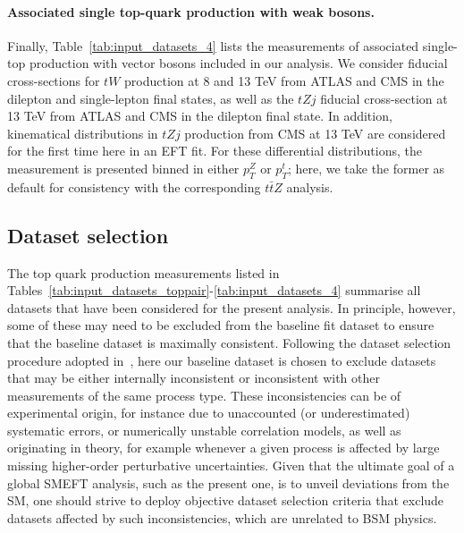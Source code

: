 \documentclass[withindex,glossary]{cam-thesis}
\begin{document}


\paragraph{Associated single top-quark production with weak bosons.}
%
Finally, Table~\ref{tab:input_datasets_4}
lists the measurements of associated single-top production with vector bosons
included in  our analysis.
%
We consider fiducial cross-sections for $tW$ production at 8 and 13 TeV
from ATLAS and CMS in the dilepton and single-lepton final states,
as well as the $tZj$ fiducial cross-section at 13 TeV from ATLAS and CMS in
the dilepton final state.
%
In addition, kinematical distributions in $tZj$ production from CMS
at 13 TeV are considered
 for the first time here in an EFT fit.
%
 For these differential distributions, the measurement is presented binned in either $p_T^Z$ or $p_T^t$;
 here, we take the former as default for consistency with the corresponding $t\bar{t}Z$ analysis.




\clearpage

\subsection{Dataset selection}
\label{sec:dataselection}

The top quark production measurements listed in
Tables~\ref{tab:input_datasets_toppair}-\ref{tab:input_datasets_4} 
summarise all datasets that have been considered for the present analysis.
In principle, however, some of these may need to be excluded from the baseline 
fit dataset to ensure that the baseline dataset is maximally consistent.
%
Following the dataset selection procedure adopted
in~\cite{NNPDF:2021njg}, here our baseline dataset is chosen to exclude datasets that may be either internally
inconsistent or inconsistent with other measurements of the same process type.
%
These inconsistencies can be of experimental origin, for instance due to
unaccounted (or underestimated) systematic errors,
or numerically unstable correlation models, as well as originating in theory,
for example whenever a given process is affected
by large missing higher-order perturbative uncertainties.
%
Given that the ultimate goal of a global SMEFT analysis, such as the present one,
is to unveil deviations from the SM, one should strive to deploy
objective dataset selection criteria that exclude datasets affected by such
inconsistencies, which are unrelated to BSM physics.
\end{document}
